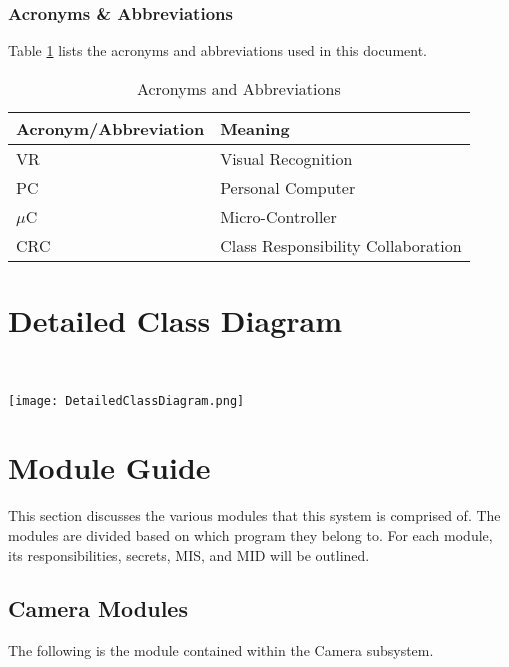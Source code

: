 \documentclass[titlepage]{article}
\begin{document}
\subsubsection{Acronyms \& Abbreviations}
Table \ref{tab:Acronyms} lists the acronyms and abbreviations used in this document.
\begin{table}[h!]
\centering
\caption{Acronyms and Abbreviations}
\begin{tabular}{| p{6cm} | p{6cm} |}\hline
	\textbf{Acronym/Abbreviation}	&\textbf{Meaning}\\\hline
	VR								&Visual Recognition\\\hline
	PC								&Personal Computer\\\hline
	$\mu$C							&Micro-Controller\\\hline
	CRC								&Class Responsibility Collaboration\\\hline
\end{tabular}
\label{tab:Acronyms}
\end{table}

\section{Detailed Class Diagram}~\\
\begin{center}
	\texttt{[image: DetailedClassDiagram.png]}
\label{fig:detailedClassDiagram}
\end{center}
\newpage

\section{Module Guide}
This section discusses the various modules that this system is comprised of. The modules are divided based on which program they belong to. For each module, its responsibilities, secrets, MIS, and MID will be outlined.
\subsection{Camera Modules}
The following is the module contained within the Camera subsystem.
\end{document}
